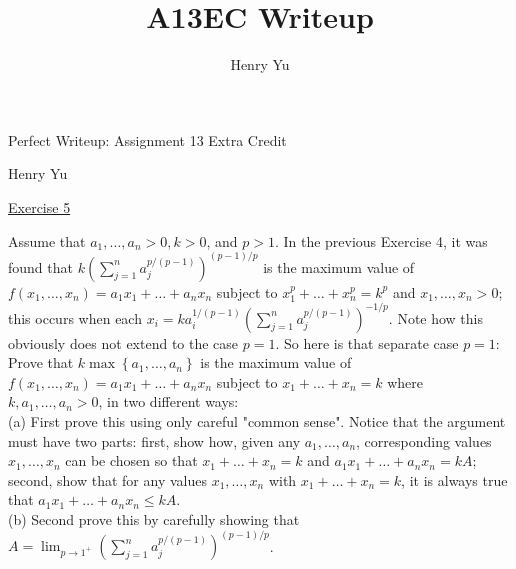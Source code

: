 \documentclass[12pt,a4paper]{article}
\author{Henry Yu}
\title{A13EC Writeup}
\begin{document}
\begin{titlepage}
	
	\begin{center}

		\vspace*{\fill}

    	\vspace*{0.5cm}
	
	    \huge{Perfect Writeup: Assignment 13 Extra Credit}
	
	    \vspace*{0.5cm}
	
	    \large{Henry Yu}
	
    	\vspace*{\fill}

	\end{center}

\end{titlepage}

\raggedright

\underline{Exercise 5}

\bigbreak

Assume that $a_{1}, \ldots, a_{n}>0, k>0$, and $p>1$. In the previous Exercise 4, it was found that $k\left(\sum_{j=1}^{n} a_{j}^{p /(p-1)}\right)^{(p-1) / p}$ is the maximum value of $f\left(x_{1}, \ldots, x_{n}\right)=a_{1} x_{1}+\ldots+a_{n} x_{n}$ subject to $x_{1}^{p}+\ldots+x_{n}^{p}=k^{p}$ and $x_{1}, \ldots, x_{n}>0$; this occurs when each $x_{i}=k a_{i}^{1 /(p-1)}\left(\sum_{j=1}^{n} a_{j}^{p /(p-1)}\right)^{-1 / p}$. Note how this obviously does not extend to the case $p=1$. So here is that separate case $p=1$: \\
Prove that $k \max \left\{a_{1}, \ldots, a_{n}\right\}$ is the maximum value of $f\left(x_{1}, \ldots, x_{n}\right)=a_{1} x_{1}+\ldots+a_{n} x_{n}$ subject to $x_{1}+\ldots+x_{n}=k$ where $k, a_{1}, \ldots, a_{n}>0$, in two different ways: \\
(a) First prove this using only careful "common sense". Notice that the argument must have two parts: first, show how, given any $a_{1}, \ldots, a_{n}$, corresponding values $x_{1}, \ldots, x_{n}$ can be chosen so that $x_{1}+\ldots+x_{n}=k$ and $a_{1} x_{1}+\ldots+a_{n} x_{n}=k A$; second, show that for any values $x_{1}, \ldots, x_{n}$ with $x_{1}+\ldots+x_{n}=k$, it is always true that $a_{1} x_{1}+\ldots+a_{n} x_{n} \leq k A$. \\
(b) Second prove this by carefully showing that $A=\lim _{p \rightarrow 1^{+}}\left(\sum_{j=1}^{n} a_{j}^{p /(p-1)}\right)^{(p-1) / p}$.
 
\end{document}
